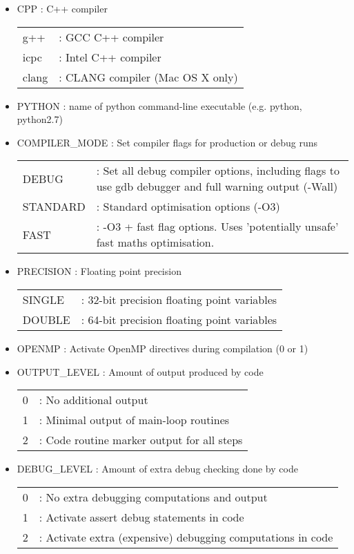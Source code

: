 \documentclass[a4paper]{article}
\begin{document}
\begin{itemize}

\item CPP : C++ compiler \\
\begin{tabular}{ll}
g++ & : GCC C++ compiler \\
icpc & : Intel C++ compiler \\
clang & : CLANG compiler (Mac OS X only)
\end{tabular}

\item PYTHON : name of python command-line executable (e.g. python, python2.7)

\item COMPILER\_MODE : Set compiler flags for production or debug runs \\
\begin{tabular}{ll}
DEBUG & : Set all debug compiler options, including flags to use gdb debugger and full warning output (-Wall) \\
STANDARD & : Standard optimisation options (-O3) \\
FAST & : -O3 + fast flag options.  Uses 'potentially unsafe' fast maths optimisation.
\end{tabular}

\item PRECISION : Floating point precision \\
\begin{tabular}{ll}
SINGLE & : 32-bit precision floating point variables \\
DOUBLE & : 64-bit precision floating point variables
\end{tabular}

\item OPENMP : Activate OpenMP directives during compilation (0 or 1)

\item OUTPUT\_LEVEL : Amount of output produced by code \\
\begin{tabular}{ll}
0 & : No additional output \\
1 & : Minimal output of main-loop routines \\
2 & : Code routine marker output for all steps
\end{tabular}

\item DEBUG\_LEVEL : Amount of extra debug checking done by code \\
\begin{tabular}{ll}
0 & : No extra debugging computations and output \\
1 & : Activate assert debug statements in code \\
2 & : Activate extra (expensive) debugging computations in code
\end{tabular}


\end{itemize}
\end{document}
